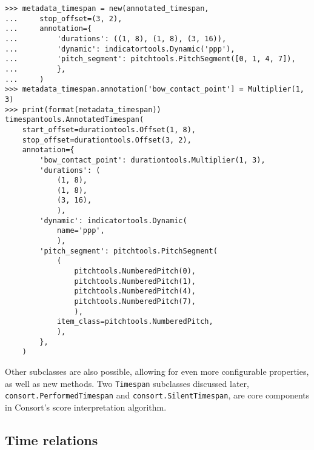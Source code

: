 \begin{comment}
<abjad>
metadata_timespan = new(annotated_timespan,
    stop_offset=(3, 2),
    annotation={
        'durations': ((1, 8), (1, 8), (3, 16)),
        'dynamic': indicatortools.Dynamic('ppp'),
        'pitch_segment': pitchtools.PitchSegment([0, 1, 4, 7]),
        },
    )
metadata_timespan.annotation['bow_contact_point'] = Multiplier(1, 3)
print(format(metadata_timespan))
</abjad>
\end{comment}

\begin{singlespacing}
\vspace{-0.5\baselineskip}
\begin{lstlisting}
>>> metadata_timespan = new(annotated_timespan,
...     stop_offset=(3, 2),
...     annotation={
...         'durations': ((1, 8), (1, 8), (3, 16)),
...         'dynamic': indicatortools.Dynamic('ppp'),
...         'pitch_segment': pitchtools.PitchSegment([0, 1, 4, 7]),
...         },
...     )
>>> metadata_timespan.annotation['bow_contact_point'] = Multiplier(1, 3)
>>> print(format(metadata_timespan))
timespantools.AnnotatedTimespan(
    start_offset=durationtools.Offset(1, 8),
    stop_offset=durationtools.Offset(3, 2),
    annotation={
        'bow_contact_point': durationtools.Multiplier(1, 3),
        'durations': (
            (1, 8),
            (1, 8),
            (3, 16),
            ),
        'dynamic': indicatortools.Dynamic(
            name='ppp',
            ),
        'pitch_segment': pitchtools.PitchSegment(
            (
                pitchtools.NumberedPitch(0),
                pitchtools.NumberedPitch(1),
                pitchtools.NumberedPitch(4),
                pitchtools.NumberedPitch(7),
                ),
            item_class=pitchtools.NumberedPitch,
            ),
        },
    )
\end{lstlisting}
\end{singlespacing}

\noindent Other subclasses are also possible, allowing for even more
configurable properties, as well as new methods. Two \texttt{Timespan}
subclasses discussed later, \texttt{consort.PerformedTimespan} and
\texttt{consort.SilentTimespan}, are core components in Consort's score
interpretation algorithm.

\subsection{Time relations} %

